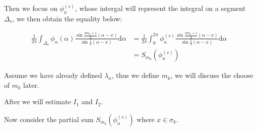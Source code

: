 \documentclass{article}
\begin{document}
Then we focus on $ \phi_n^{(s)} $, whose intergal will represent the integral on a segment $ \Delta_s $, we then obtain the equality below:

\begin{align*}
    \frac{1}{2\pi}\int_{\Delta_s}\phi_n(\alpha)\frac{\sin\frac{2m_k+1}{2}(\alpha-x)}{\sin\frac{1}{2}(\alpha-x)}\mathrm{d}\alpha 
    &=\frac{1}{2\pi}\int_{0}^{2\pi}\phi_n^{(s)}\frac{\sin\frac{2m_k+1}{2}(\alpha-x)}{\sin\frac{1}{2}(\alpha-x)}\mathrm{d}\alpha\\
    &= S_{m_k}(\phi_n^{(s)})
\end{align*}
\par 
Assume we have already defined $ \lambda_n $, thus we define $ m_k $, we will discuss the choose of $ m_k $ later.\par 
After we will estimate $ I_1 $ and $ I_2 $.

Now consider the partial sum $ S_{m_k}(\phi_n^{(s)}) $ where $ x \in \sigma_k $.
\end{document}
